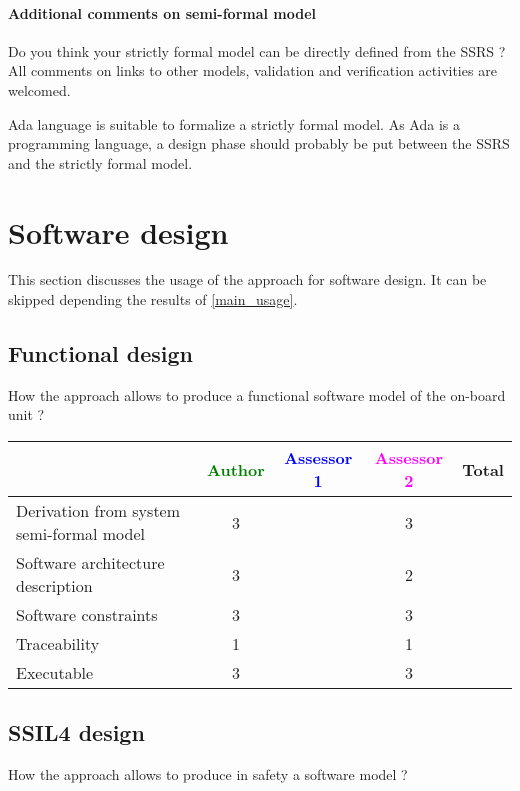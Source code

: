 \paragraph{Additional comments on semi-formal  model} Do you think your strictly formal  model can be directly defined from the SSRS ?
All comments on links to  other models, validation and verification activities are welcomed.

Ada language is suitable to formalize a strictly formal model. As Ada
is a programming language, a design phase should probably be put
between the SSRS and the strictly formal model.

\section{Software design}
This section discusses the usage of the approach for software design.
It can be skipped depending the results of \ref{main_usage}.

\subsection{Functional design}

How the approach allows to  produce a functional software model of the on-board unit ?

\begin{tabular}{|l | c | c | c | c|}
\hline
& \textcolor{green}{Author} & \textcolor{blue}{Assessor 1} & \textcolor{magenta}{Assessor 2} & Total \\
\hline
Derivation from system semi-formal model  & 3 & & 3 &  \\
\hline 
Software architecture description  & 3 & & 2 &  \\
\hline
Software constraints  & 3 & & 3 &  \\
\hline
Traceability  & 1 & & 1 &  \\
\hline
Executable  & 3 & & 3 &  \\
\hline
\end{tabular}

\subsection{SSIL4 design}

How the approach allows to  produce in safety a software model ?


